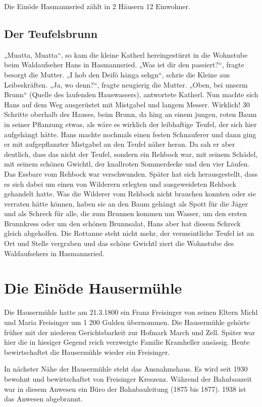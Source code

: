 \documentclass{book}
\begin{document}
Die Einöde Hasmannsried zählt in 2 Häusern 12 Einwohner.

\subsection{Der Teufelsbrunn}

„Muatta, Muatta“, so kam die kleine Katherl hereingestürzt in die
Wohnstube beim Waldaufseher Hans in Hasmannsried. „Was ist dir den
passiert?“, fragte besorgt die Mutter. „I hob den Deifö hänga sehgn“,
schrie die Kleine aus Leibeskräften. „Ja, wo denn?“, fragte neugierig
die Mutter. „Oben, bei unserm Brunn“ (Quelle des laufenden Hauswassers),
antwortete Katherl. Nun machte sich Hans auf dem Weg ausgerüstet mit
Mistgabel und langem Messer. Wirklich! 30 Schritte oberhalb des Hauses,
beim Brunn, da hing an einem jungen, roten Baum in seiner Pflanzung
etwas, als wäre es wirklich der leibhaftige Teufel, der sich hier
aufgehängt hätte. Hans machte nochmals einen festen Schnauferer und dann
ging er mit aufgepflanzter Mistgabel an den Teufel näher heran. Da sah
er aber deutlich, dass das nicht der Teufel, sondern ein Rehbock war,
mit seinem Schädel, mit seinem schönen Gwichtl, der knallroten
Sommerdecke und den vier Läufen. Das Essbare vom Rehbock war
verschwunden. Später hat sich herausgestellt, dass es sich dabei um
einen von Wilderern erlegten und ausgeweideten Rehbock gehandelt hatte.
Was die Wilderer vom Rehbock nicht brauchen konnten oder sie verraten
hätte können, haben sie an den Baum gehängt als Spott für die Jäger und
als Schreck für alle, die zum Brunnen kommen um Wasser, um den ersten
Brunnkress oder um den schönen Brunnsalat, Hans aber hat diesem Schreck
gleich abgeholfen. Die Rottanne steht nicht mehr, der vermeintliche
Teufel ist an Ort und Stelle vergraben und das schöne Gwichtl ziert die
Wohnstube des Waldaufsehers in Hasmannsried.

\section{Die Einöde Hausermühle}

Die Hausermühle hatte am 21.3.1800 ein Franz Freisinger von seinen
Eltern Michl und Maria Freisinger um 1 200 Gulden übernommen. Die
Hausermühle gehörte früher mit der niederen Gerichtsbarkeit zur Hofmark
March und Zell. Später war hier die in hiesiger Gegend reich verzweigte
Familie Kramheller ansässig. Heute bewirtschaftet die Hausermühle wieder
ein Freisinger.

In nächster Nähe der Hausermühle steht das Ausnahmshaus. Es wird seit
1930 bewohnt und bewirtschaftet von Freisinger Kreszenz. Während der
Bahnbauzeit war in diesem Anwesen ein Büro der Bahnbauleitung (1875 bis
1877). 1938 ist das Anwesen abgebrannt.
\end{document}
